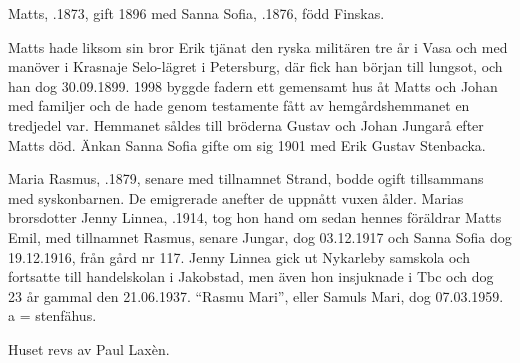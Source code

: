 Matts, .1873, gift 1896 med Sanna Sofia, .1876, född Finskas.
\begin{jhchildren}
  \item {}
  \item {}
\end{jhchildren}
Matts hade liksom sin bror Erik tjänat den ryska militären tre år i Vasa och med manöver i Krasnaje Selo-lägret i Petersburg, där fick han början till lungsot, och han dog 30.09.1899. 1998 byggde fadern ett gemensamt hus åt Matts och Johan med familjer och de hade genom testamente fått av hemgårdshemmanet en tredjedel var. Hemmanet såldes till bröderna Gustav och Johan Jungarå efter Matts död. Änkan Sanna Sofia gifte om sig 1901 med Erik Gustav Stenbacka.





Maria Rasmus, .1879, senare med tillnamnet Strand, bodde ogift tillsammans med syskonbarnen. De emigrerade anefter de uppnått vuxen ålder. Marias brorsdotter Jenny Linnea, .1914, tog hon hand om sedan hennes föräldrar Matts Emil, med tillnamnet Rasmus, senare Jungar, dog 03.12.1917 och Sanna Sofia dog 19.12.1916, från	gård nr 117. Jenny Linnea gick ut Nykarleby samskola och fortsatte till handelskolan i Jakobstad, men även hon insjuknade i Tbc och dog 23 år gammal den 21.06.1937. ``Rasmu Mari'', eller Samuls Mari, dog 07.03.1959. a = stenfähus.

Huset revs av Paul Laxèn.


